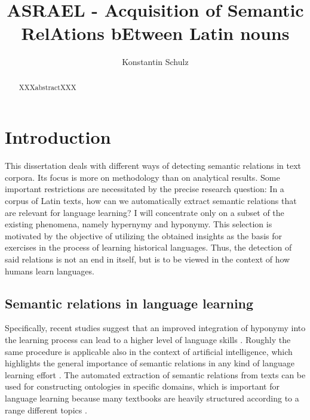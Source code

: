 \documentclass[runningheads]{llncs}
\begin{document}
\title{ASRAEL - Acquisition of Semantic RelAtions bEtween Latin nouns}
\author{Konstantin Schulz}
\maketitle 

\tableofcontents
\listoffigures
\listoftables
\printglossaries

\begin{abstract}
	XXXabstractXXX
\end{abstract}
                        
\section{Introduction}
This dissertation deals with different ways of detecting semantic relations in text corpora. Its focus is more on methodology than on analytical results. Some important restrictions are necessitated by the precise research question: In a corpus of Latin texts, how can we automatically extract semantic relations that are relevant for language learning? I will concentrate only on a subset of the existing phenomena, namely hypernymy and hyponymy. This selection is motivated by the objective of utilizing the obtained insights as the basis for exercises in the process of learning historical languages. Thus, the detection of said relations is not an end in itself, but is to be viewed in the context of how humans learn languages. 

\subsection{Semantic relations in language learning}
Specifically, recent studies suggest that an improved integration of hyponymy into the learning process can lead to a higher level of language skills \parencite[196]{taslimExperimentalStudyTeaching2014}. Roughly the same procedure is applicable also in the context of artificial intelligence, which highlights the general importance of semantic relations in any kind of language learning effort \parencite[1306]{carlsonArchitectureNeverendingLanguage2010}. The automated extraction of semantic relations from texts can be used for constructing ontologies in specific domains, which is important for language learning because many textbooks are heavily structured according to a range different topics \parencite[192f.]{punuruLearningNontaxonomicalSemantic2012}. 
\end{document}

